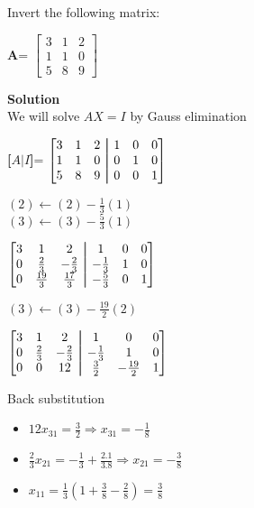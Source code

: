 \documentclass[12pt]{article}
\newcommand\aug{\fboxsep=-\fboxrule\!\!\!\fbox{\strut}\!\!\!}
\newenvironment{exercise}[2][Exercise]{\begin{trivlist}
\item[\hskip \labelsep {\bfseries #1}\hskip \labelsep {\bfseries #2.}]}{\end{trivlist}}
\begin{document}
\begin{exercise}{6} %
Invert the following matrix:
\begin{center}
\textbf{A}=
$\begin{bmatrix}
3&1&2\\
1&1&0\\
5&8&9
\end{bmatrix}
$
\end{center}
\textbf{Solution}\\

We will solve $AX=I$ by Gauss elimination\\
\begin{center}
\textbf{[$A \vert I$]}=
$\begin{bmatrix}
3&1&2 &\aug&1&0&0\\
1&1&0 &\aug& 0&1&0\\
5&8&9 &\aug& 0&0&1
\end{bmatrix}
$ \\
\end{center}
$(2) \leftarrow (2) - \frac{1}{3}(1)$\\
$(3) \leftarrow (3) - \frac{5}{3}(1)$\\
\begin{center}
$\begin{bmatrix}
3&1&2 &\aug&1&0&0\\
0&\frac{2}{3}&-\frac{2}{3} &\aug&-\frac{1}{3}&1&0\\
0&\frac{19}{3}&\frac{17}{3} &\aug& -\frac{5}{3}&0&1
\end{bmatrix}
$ \\
\end{center}
$(3) \leftarrow (3) - \frac{19}{2}(2)$\\
\begin{center}
$\begin{bmatrix}
3&1&2 &\aug&1&0&0\\
0&\frac{2}{3}&-\frac{2}{3} &\aug&-\frac{1}{3}&1&0\\
0&0&12 &\aug& \frac{3}{2}&-\frac{19}{2}&1
\end{bmatrix}
$ \\
\end{center}

Back substitution
\begin{itemize}
\item $12x_{31} = \frac{3}{2} \Rightarrow x_{31} = -\frac{1}{8}$
\item $\frac{2}{3}x_{21} = -\frac{1}{3} + \frac{2.1}{3.8} \Rightarrow x_{21} = -\frac{3}{8}$
\item $x_{11} = \frac{1}{3}(1+\frac{3}{8}-\frac{2}{8}) = \frac{3}{8}$
\end{itemize}


\end{exercise}
\end{document}
